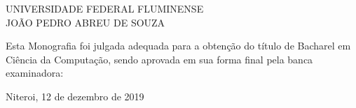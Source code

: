 
%
% 
%
\begin{folhadeaprovacao}


\begin{center}


            {UNIVERSIDADE FEDERAL FLUMINENSE} \\
           

    \vspace{1.5cm}
                                    {JOÃO PEDRO ABREU DE SOUZA}\\
    \bfseries{}
\end{center}

Esta Monografia foi julgada adequada para a obten\c{c}\~{a}o do título  de Bacharel em Ciência da Computação, sendo aprovada em sua forma final  pela banca examinadora:

    \vspace{2.5cm}
    \vspace{3 cm}%

    \begin{center}
        Niteroi, 12 de dezembro de 2019
    \end{center}
  
\end{folhadeaprovacao}